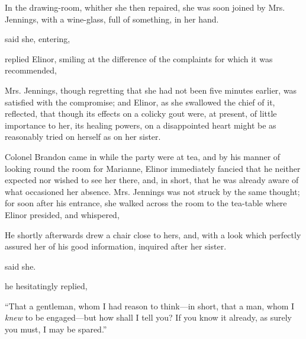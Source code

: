 In the drawing-room, whither she then repaired, she was soon joined by Mrs. Jennings, with a wine-glass, full of something, in her hand.

 said she, entering, 

 replied Elinor, smiling at the difference of the complaints for which it was recommended, 

Mrs. Jennings, though regretting that she had not been five minutes earlier, was satisfied with the compromise; and Elinor, as she swallowed the chief of it, reflected, that though its effects on a colicky gout were, at present, of little importance to her, its healing powers, on a disappointed heart might be as reasonably tried on herself as on her sister.

Colonel Brandon came in while the party were at tea, and by his manner of looking round the room for Marianne, Elinor immediately fancied that he neither expected nor wished to see her there, and, in short, that he was already aware of what occasioned her absence. Mrs. Jennings was not struck by the same thought; for soon after his entrance, she walked across the room to the tea-table where Elinor presided, and whispered, 

He shortly afterwards drew a chair close to hers, and, with a look which perfectly assured her of his good information, inquired after her sister.

 said she. 

 he hesitatingly replied, 


“That a gentleman, whom I had reason to think---in short, that a man, whom I {\em knew} to be engaged---but how shall I tell you? If you know it already, as surely you must, I may be spared.”

